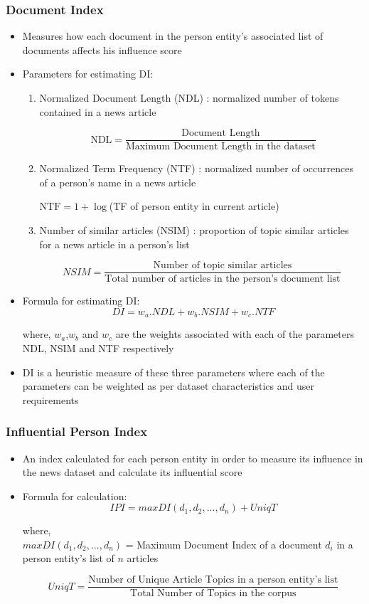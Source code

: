 \documentclass{beamer}
\begin{document}
\begin{frame}[allowframebreaks]
\frametitle{Document Index}
\begin{itemize}
\item
Measures how each document in the person entity's associated list of documents affects his influence score
\item
Parameters for estimating DI:
\begin{enumerate}
\item
\alert{ Normalized Document Length} (NDL) : normalized number of tokens contained in a news article

$$\text{ NDL}=\dfrac{\text{Document Length}} {\text{Maximum Document Length in the dataset}}$$

\item
\alert{Normalized Term Frequency} (NTF) : normalized number of occurrences of a person's name in a news article\\ \vspace{0.15in}

$\text{NTF}=	1	+\log	$(TF of person entity in current article)\\ \vspace{0.1in}

\item  
\alert{Number of similar articles} (NSIM) :  proportion of topic similar articles for a news article in a person's list

$$NSIM= \dfrac{\text{Number of topic similar articles}} {\text{Total number of articles in the person's document list}}$$

\end{enumerate}

\item
Formula for estimating DI:
$$DI = w_a . NDL + w_b . NSIM + w_c . NTF $$

where, $w_a$,$ w_b$ and $w_c$ are the weights associated with each of the parameters NDL, NSIM and NTF respectively

\item
DI is a heuristic measure of these three parameters where each of the parameters can be weighted as per dataset characteristics and user requirements
\end{itemize}
\end{frame}

\begin{frame}
\frametitle{Influential Person Index}
\begin{itemize}
\item
An index calculated for each person entity in order to measure its influence in the news dataset and calculate its influential score
\item
Formula for calculation:
$$IPI= max DI(d_1, d_2, ...,d_n)+ UniqT$$

where, \\
 $max DI(d_1, d_2, ...,d_n)$ = Maximum Document Index of a document $d_i$ in a person entity's list of  $n$ articles

$$UniqT = \dfrac{\text{Number of Unique Article Topics in a person entity's list}}{\text{Total Number of Topics in the corpus}}$$

\end{itemize}
\end{frame}
\end{document}

